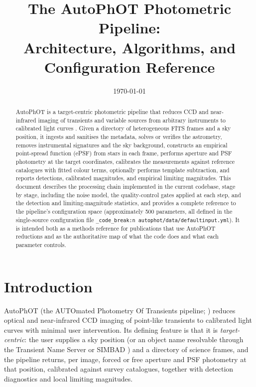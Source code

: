\documentclass[11pt,a4paper]{article}
\title{The AutoPhOT Photometric Pipeline:\\Architecture, Algorithms, and Configuration Reference}
\author{}
\date{\today}
\renewcommand{\_}{\autophotunderscore\allowbreak}
\DeclareRobustCommand{\code}[1]{\texttt{\autophot_code_break:n {#1}}}
\begin{document}
\maketitle

\begin{abstract}
AutoPhOT is a target-centric photometric pipeline that reduces CCD and
near-infrared imaging of transients and variable sources from arbitrary
instruments to calibrated light curves \citep{brennan2022autophot}. Given a
directory of heterogeneous FITS frames and a sky position, it ingests and
sanitises the metadata, solves or verifies the astrometry, removes
instrumental signatures and the sky background, constructs an empirical
point-spread function (ePSF) from stars in each frame, performs aperture and
PSF photometry at the target coordinates, calibrates the measurements against
reference catalogues with fitted colour terms, optionally performs
template subtraction, and reports detections, calibrated magnitudes, and
empirical limiting magnitudes. This document describes the processing chain
implemented in the current codebase, stage by stage, including the noise
model, the quality-control gates applied at each step, and the detection
and limiting-magnitude statistics, and provides a complete reference to the
pipeline's configuration space (approximately 500 parameters, all defined in
the single-source configuration file \code{autophot/data/default\_input.yml}).
It is intended both as a methods reference for publications that use
AutoPhOT reductions and as the authoritative map of what the code does and
what each parameter controls.
\end{abstract}

\tableofcontents
\newpage

\section{Introduction}

AutoPhOT (the AUTOmated Photometry Of Transients pipeline;
\citealp{brennan2022autophot}) reduces optical and near-infrared CCD imaging
of point-like transients to calibrated light curves with minimal user
intervention. Its defining feature is that it is \emph{target-centric}: the
user supplies a sky position (or an object name resolvable through the
Transient Name Server \citep{tns} or SIMBAD \citep{wenger2000simbad}) and
a directory of science frames, and the
pipeline returns, per image, forced or free aperture and PSF photometry at
that position, calibrated against survey catalogues, together with
detection diagnostics and local limiting magnitudes.
\end{document}
